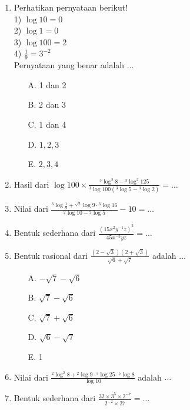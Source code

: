 \documentclass{article}
\begin{document}
\begin{enumerate}
    \item Perhatikan pernyataan berikut!\\
    1) $\log 10 = 0$\\
    2) $\log 1=0$\\
    3) $\log 100 =2$\\
    4) $\displaystyle \frac{1}{9} = 3^{-2}$\\
    Pernyataan yang benar adalah $\dots$
    \begin{multicols}{3}
        \begin{enumerate}
            \item[A.] 1 dan 2
            \item[B.] 2 dan 3
            \item[C.] 1 dan 4
            \item[D.] $1,2,3$
            \item[E.] $2,3,4$
        \end{enumerate}
    \end{multicols}

    \item Hasil dari $\displaystyle \log 100 \times \frac{{}^3 \log^2 8- {}^3 \log^2 125}{{}^3 \log 100 ({}^3 \log 5 - {}^3 \log 2)}=\dots$
    \item Nilai dari $\displaystyle \frac{{}^3 \log \frac{1}{9}+{}^{\sqrt{2}}\log 9 \cdot {}^3 \log 16}{{}^2 \log 10 - {}^2 \log 5}-10=\dots$
    \item Bentuk sederhana dari $\displaystyle \frac{(15x^2 y^{-1}z)^2}{45x^{-3}yz}=\dots$
    \item Bentuk rasional dari $\displaystyle \frac{(2-\sqrt{3})(2+\sqrt{3})}{\sqrt{6}+\sqrt{7}}$ adalah $\dots$
    \begin{multicols}{3}
        \begin{enumerate}
            \item[A.] $-\sqrt{7}-\sqrt{6}$
            \item[B.] $\sqrt{7}-\sqrt{6}$
            \item[C.] $\sqrt{7}+\sqrt{6}$
            \item[D.] $\sqrt{6}-\sqrt{7}$
            \item[E.] 1
        \end{enumerate}
    \end{multicols}

    \item Nilai dari $\displaystyle \frac{{}^2 \log^2 8+{}^2 \log 9 \cdot{}^3 \log 25 \cdot{}^5 \log 8}{\log 10}$ adalah $\dots$
    \item Bentuk sederhana dari $\displaystyle \frac{32 \times3^5 \times 2^{-7}}{2^{-2} \times 27}=\dots$ 

\end{enumerate}
\end{document}
